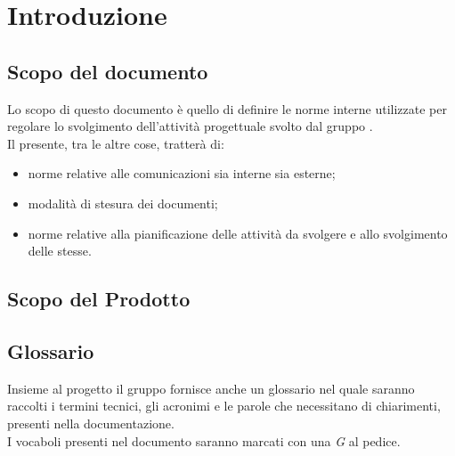 \section{Introduzione}

\subsection{Scopo del documento}

Lo scopo di questo documento è quello di definire le norme interne utilizzate per regolare lo svolgimento dell'attività progettuale \ProjectName\space svolto dal gruppo \GroupName.\\
Il presente, tra le altre cose, tratterà di:
\begin{itemize}
	\item norme relative alle comunicazioni sia interne sia esterne;
\item modalità di stesura dei documenti;
\item norme relative alla pianificazione delle attività da svolgere e allo svolgimento delle stesse.
\end{itemize}

\subsection{Scopo del Prodotto}
\ScopoDelProdotto

\subsection{Glossario}
Insieme al progetto il gruppo fornisce anche un glossario nel quale saranno raccolti i termini tecnici, gli acronimi e le parole che necessitano di chiarimenti, presenti nella documentazione.\\
I vocaboli presenti nel documento \Glossario\space saranno marcati con una \textit{{{\small G}}} al pedice.






